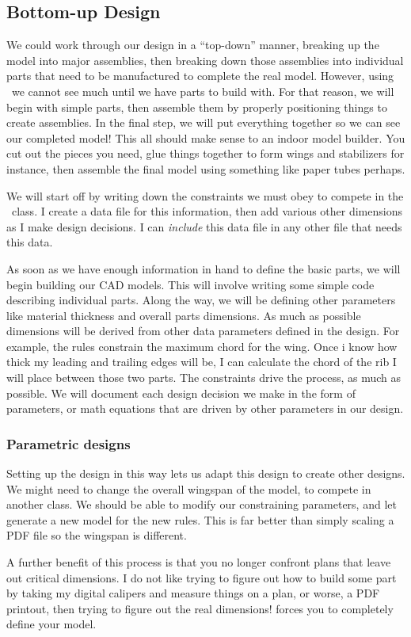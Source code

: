 \subsection{Bottom-up Design}

We could work through our design in a ``top-down'' manner, breaking up the model
into major assemblies, then breaking down those assemblies into individual parts
that need to be manufactured to complete the real model. However, using \osc\ we
cannot see much until we have parts  to build with. For that reason, we will
begin with simple parts, then assemble them by properly positioning things to
create assemblies. In the final step, we will put everything together so we can
see our completed model! This all should make sense to an indoor model builder.
You cut out the pieces you need, glue things together to form wings and
stabilizers for instance, then assemble the final model using something like
paper tubes perhaps.

We will start off by writing down the constraints we must obey to compete in the
\LPP\ class. I create a data file for this information, then add various other
dimensions as I make design decisions. I can {\it include} this data file in any
other file that needs this data.

As soon as we have enough information in hand to define the basic parts, we will
begin building our CAD models. This will involve writing some simple code
describing individual parts. Along the way, we will be defining other parameters
like material thickness and overall parts dimensions.  As much as possible
dimensions will be derived from other data parameters defined in the design. For
example, the rules constrain the maximum chord for the wing. Once i know how
thick my leading and trailing edges will be, I can calculate the chord of the
rib I will place between those two parts. The constraints drive the process, as
much as possible. We will document each design decision we make in the form of
parameters, or math equations that are driven by other parameters in our design.

\subsubsection{Parametric designs}

Setting up the design in this way lets us adapt this design to create other
designs. We might need to change the overall wingspan of the model, to compete
in another class. We should be able to modify our constraining parameters, and
let \osc generate a new model for the new rules. This is far better than simply
scaling a PDF file so the wingspan is different.

A further benefit of this process is that you no longer confront plans that
leave out critical dimensions. I do not like trying to figure out how to build
some part by taking my digital calipers and measure things on a plan, or worse,
a  PDF printout, then trying to figure out the real dimensions! \osc forces you
to completely define your model.

